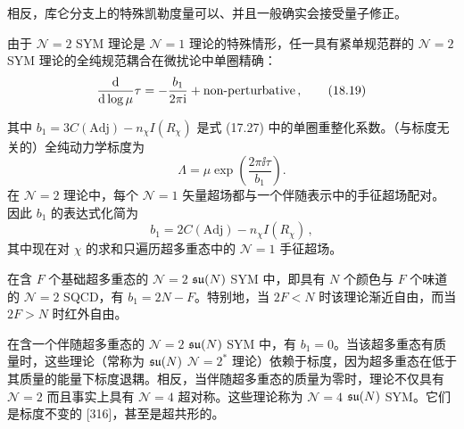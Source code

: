 相反，库仑分支上的特殊凯勒度量可以、并且一般确实会接受量子修正。

由于 $\mathcal N=2$ SYM 理论是 $\mathcal N=1$ 理论的特殊情形，任一具有紧单规范群的 $\mathcal N=2$ SYM 理论的全纯规范耦合在微扰论中单圈精确：
\begin{equation}
\frac{\mathrm{d}}{\mathrm{d}\log\mu}\tau=-\frac{b_1}{2\pi\mathrm{i}}+\text{non-perturbative}\,, \tag{18.19}
\end{equation}

其中 $b_1=3C(\mathrm{Adj})-n_\chi I(R_\chi)$ 是式 (17.27) 中的单圈重整化系数。（与标度无关的）全纯动力学标度为
\begin{equation}
\Lambda=\mu\exp\left(\frac{2\pi\ii\tau}{b_1}\right). \tag{18.20}
\end{equation}
在 $\mathcal N=2$ 理论中，每个 $\mathcal N=1$ 矢量超场都与一个伴随表示中的手征超场配对。因此 $b_1$ 的表达式化简为
\[
b_1=2C(\mathrm{Adj})-n_\chi I(R_\chi)\,,
\]
其中现在对 $\chi$ 的求和只遍历超多重态中的 $\mathcal N=1$ 手征超场。

\begin{example}[18.19]
在含 $F$ 个基础超多重态的 $\mathcal N=2$ $\mathfrak{su}(N)$ SYM 中，即具有 $N$ 个颜色与 $F$ 个味道的 $\mathcal N=2$ SQCD，有 $b_1=2N-F$。特别地，当 $2F<N$ 时该理论渐近自由，而当 $2F>N$ 时红外自由。
\end{example}

\begin{example}[18.20]
在含一个伴随超多重态的 $\mathcal N=2$ $\mathfrak{su}(N)$ SYM 中，有 $b_1=0$。当该超多重态有质量时，这些理论（常称为 $\mathfrak{su}(N)$ $\mathcal N=2^*$ 理论）依赖于标度，因为超多重态在低于其质量的能量下标度退耦。相反，当伴随超多重态的质量为零时，理论不仅具有 $\mathcal N=2$ 而且事实上具有 $\mathcal N=4$ 超对称。这些理论称为 $\mathcal N=4$ $\mathfrak{su}(N)$ SYM。它们是标度不变的 [316]，甚至是超共形的。
\end{example}


